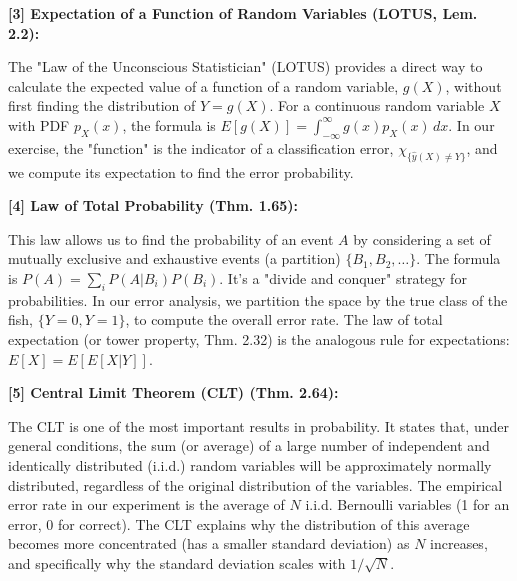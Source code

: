 \documentclass[11pt,a4paper]{article}
\begin{document}
\vspace{1em}
\hypertarget{concept:lotus}{\textbf{[3] Expectation of a Function of Random Variables (LOTUS, Lem. 2.2):}}
The "Law of the Unconscious Statistician" (LOTUS) provides a direct way to calculate the expected value of a function of a random variable, $g(X)$, without first finding the distribution of $Y=g(X)$. For a continuous random variable $X$ with PDF $p_X(x)$, the formula is $E[g(X)] = \int_{-\infty}^{\infty} g(x) p_X(x) \,dx$. In our exercise, the "function" is the indicator of a classification error, $\chi_{\{\hat{y}(X) \neq Y\}}$, and we compute its expectation to find the error probability.

\vspace{1em}
\hypertarget{concept:tp}{\textbf{[4] Law of Total Probability (Thm. 1.65):}}
This law allows us to find the probability of an event $A$ by considering a set of mutually exclusive and exhaustive events (a partition) $\{B_1, B_2, \dots\}$. The formula is $P(A) = \sum_i P(A|B_i)P(B_i)$. It's a "divide and conquer" strategy for probabilities. In our error analysis, we partition the space by the true class of the fish, $\{Y=0, Y=1\}$, to compute the overall error rate. The law of total expectation (or tower property, Thm. 2.32) is the analogous rule for expectations: $E[X] = E[E[X|Y]]$.

\vspace{1em}
\hypertarget{concept:clt}{\textbf{[5] Central Limit Theorem (CLT) (Thm. 2.64):}}
The CLT is one of the most important results in probability. It states that, under general conditions, the sum (or average) of a large number of independent and identically distributed (i.i.d.) random variables will be approximately normally distributed, regardless of the original distribution of the variables. The empirical error rate in our experiment is the average of $N$ i.i.d. Bernoulli variables (1 for an error, 0 for correct). The CLT explains why the distribution of this average becomes more concentrated (has a smaller standard deviation) as $N$ increases, and specifically why the standard deviation scales with $1/\sqrt{N}$.
\end{document}
